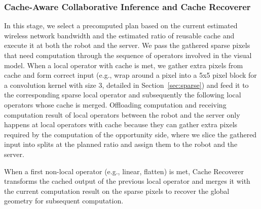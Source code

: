 \subsubsection{Cache-Aware Collaborative Inference and Cache Recoverer}
In this stage, we select a precomputed plan based on the current estimated wireless network bandwidth and the estimated ratio of reusable cache and execute it at both the robot and the server.
We pass the gathered sparse pixels that need computation through the sequence of operators involved in the visual model.
When a local operator with cache is met, we gather extra pixels from cache and form correct input (e.g., wrap around a pixel into a 5x5 pixel block for a convolution kernel with size 3, detailed in Section~\ref{sec:sparse}) and feed it to the corresponding sparse local operator and subsequently the following local operators whose cache is merged.
Offloading computation and receiving computation result of local operators between the robot and the server only happens at local operators with cache because they can gather extra pixels required by the computation of the opportunity side, where we slice the gathered input into splits at the planned ratio and assign them to the robot and the server.

When a first non-local operator (e.g., linear, flatten) is met, Cache Recoverer transforms the cached output of the previous local operator and merges it with the current computation result on the sparse pixels to recover the global geometry for subsequent computation.






